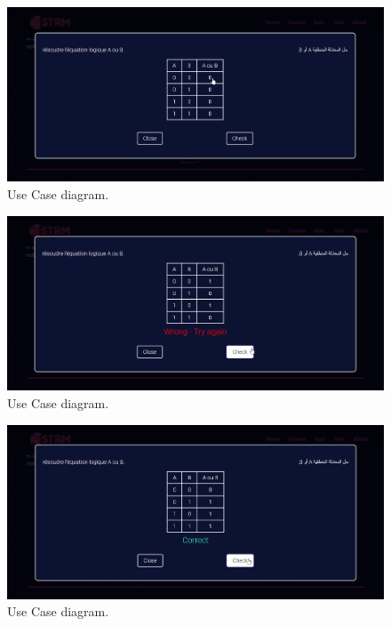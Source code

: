\begin{figure}[ht]
	\centering
	\label{}\includegraphics[scale=0.5]{img/10.png}                
	\caption{Use Case diagram.} 
	\label{fig:UseCaseD}
\end{figure} 

\newpage

\begin{figure}[ht]
	\centering
	\label{}\includegraphics[scale=0.5]{img/11.png}                
	\caption{Use Case diagram.} 
	\label{fig:UseCaseD}
\end{figure} 


\begin{figure}[ht]
	\centering
	\label{}\includegraphics[scale=0.5]{img/12.png}                
	\caption{Use Case diagram.} 
	\label{fig:UseCaseD}
\end{figure} 


